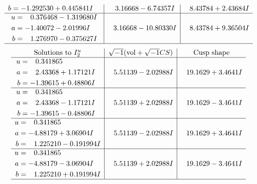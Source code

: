 \documentclass[1p]{elsarticle_modified}
\theoremstyle{definition}
\newcommand{\I}{\sqrt{-1}}
\begin{document}
$$\begin{array}{c|c|c}
\begin{aligned}
b &= -1.292530 + 0.445841 I\end{aligned}
 & \phantom{-}3.16668 - 6.74357 I & \phantom{-}8.43784 + 2.43684 I \\ \hline\begin{aligned}
u &= \phantom{-}0.376468 - 1.319680 I \\
a &= -1.40072 - 2.01996 I \\
b &= \phantom{-}1.276970 - 0.375627 I\end{aligned}
 & \phantom{-}3.16668 - 10.80330 I & \phantom{-}8.43784 + 9.36504 I\\
 \hline 
 \end{array}$$\newpage$$\begin{array}{c|c|c}  
\text{Solutions to }I^u_{2}& \I (\text{vol} + \sqrt{-1}CS) & \text{Cusp shape}\\
 \hline 
\begin{aligned}
u &= \phantom{-}0.341865\phantom{ +0.000000I} \\
a &= \phantom{-}2.43368 + 1.17121 I \\
b &= -1.39615 + 0.48806 I\end{aligned}
 & \phantom{-}5.51139 - 2.02988 I & \phantom{-}19.1629 + 3.4641 I \\ \hline\begin{aligned}
u &= \phantom{-}0.341865\phantom{ +0.000000I} \\
a &= \phantom{-}2.43368 - 1.17121 I \\
b &= -1.39615 - 0.48806 I\end{aligned}
 & \phantom{-}5.51139 + 2.02988 I & \phantom{-}19.1629 - 3.4641 I \\ \hline\begin{aligned}
u &= \phantom{-}0.341865\phantom{ +0.000000I} \\
a &= -4.88179 + 3.06904 I \\
b &= \phantom{-}1.225210 - 0.191994 I\end{aligned}
 & \phantom{-}5.51139 - 2.02988 I & \phantom{-}19.1629 + 3.4641 I \\ \hline\begin{aligned}
u &= \phantom{-}0.341865\phantom{ +0.000000I} \\
a &= -4.88179 - 3.06904 I \\
b &= \phantom{-}1.225210 + 0.191994 I\end{aligned}
 & \phantom{-}5.51139 + 2.02988 I & \phantom{-}19.1629 - 3.4641 I\\
 \hline 
 \end{array}$$\newpage\newpage\renewcommand{\arraystretch}{1}
\end{document}
